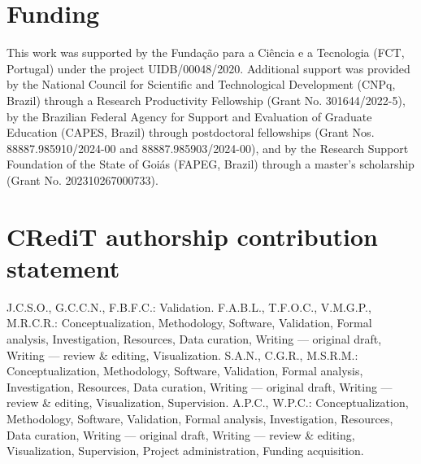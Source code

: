 \documentclass[times,final]{elsarticle}
\begin{document}
\section*{Funding}
This work was supported by the Fundação para a Ciência e a Tecnologia (FCT, Portugal) under the project UIDB/00048/2020. Additional support was provided by the National Council for Scientific and Technological Development (CNPq, Brazil) through a Research Productivity Fellowship (Grant No. 301644/2022-5), by the Brazilian Federal Agency for Support and Evaluation of Graduate Education (CAPES, Brazil) through postdoctoral fellowships (Grant Nos. 88887.985910/2024-00 and 88887.985903/2024-00), and by the Research Support Foundation of the State of Goiás (FAPEG, Brazil) through a master's scholarship (Grant No. 202310267000733).
\section*{CRediT authorship contribution statement}
J.C.S.O., G.C.C.N., F.B.F.C.: Validation.
F.A.B.L., T.F.O.C., V.M.G.P., M.R.C.R.: Conceptualization, Methodology, Software, Validation, Formal analysis, Investigation, Resources, Data curation, Writing — original draft, Writing — review \& editing, Visualization.
S.A.N., C.G.R., M.S.R.M.: Conceptualization, Methodology, Software, Validation, Formal analysis, Investigation, Resources, Data curation, Writing — original draft, Writing — review \& editing, Visualization, Supervision.
A.P.C., W.P.C.: Conceptualization, Methodology, Software, Validation, Formal analysis, Investigation, Resources, Data curation, Writing — original draft, Writing — review \& editing, Visualization, Supervision, Project administration, Funding acquisition.
\end{document}
